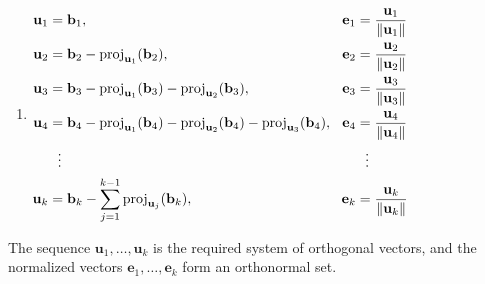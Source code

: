 \begin{enumerate}
\begin{enumerate}
        \item ${
        \displaystyle
        {\begin{aligned}
            \mathbf {u} _{1} &=\mathbf {b} _{1}, &\!\mathbf {e} _{1}&={\dfrac {\mathbf {u} _{1}}{\|\mathbf {u} _{1}\|}}
            \\\mathbf {u} _{2}&=\mathbf {b} _{2}-\operatorname {proj} _{\mathbf {u} _{1}}(\mathbf {b} _{2}),&\!\mathbf {e} _{2}&={\dfrac {\mathbf {u} _{2}}{\|\mathbf {u} _{2}\|}}
            \\\mathbf {u} _{3}&=\mathbf {b} _{3}-\operatorname {proj} _{\mathbf {u} _{1}}(\mathbf {b} _{3})-\operatorname {proj} _{\mathbf {u} _{2}}(\mathbf {b} _{3}),&\!\mathbf {e} _{3}&={\dfrac {\mathbf {u} _{3}}{\|\mathbf {u} _{3}\|}}
            \\\mathbf {u} _{4}&=\mathbf {b} _{4}-\operatorname {proj} _{\mathbf {u} _{1}}(\mathbf {b} _{4})-\operatorname {proj} _{\mathbf {u} _{2}}(\mathbf {b} _{4})-\operatorname {proj} _{\mathbf {u} _{3}}(\mathbf {b} _{4}),&\!\mathbf {e} _{4}&={\mathbf {u} _{4} \over \|\mathbf {u} _{4}\|}
            \\&{}\ \ \vdots &&{}\ \ \vdots
            \\\mathbf {u} _{k}&=\mathbf {b} _{k}-\sum _{j=1}^{k-1}\operatorname {proj} _{\mathbf {u} _{j}}(\mathbf {b} _{k}),&\!\mathbf {e} _{k}&={\dfrac {\mathbf {u} _{k}}{\|\mathbf {u} _{k}\|}}
        \end{aligned}}
        }$
        \hfill \cite{wiki/Gram-Schmidt_process}
    \end{enumerate}
    The sequence ${\displaystyle \mathbf {u} _{1},\ldots ,\mathbf {u} _{k}}$ is the required system of orthogonal vectors, and the normalized vectors ${\displaystyle \mathbf {e} _{1},\ldots ,\mathbf {e} _{k}}$ form an orthonormal set.
    \hfill \cite{wiki/Gram-Schmidt_process}
\end{enumerate}


